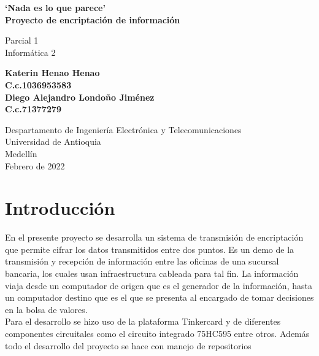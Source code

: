 \documentclass{article}
\begin{document}
\begin{titlepage}
    \begin{center}
        \vspace*{2cm}
            
        \Huge
        \textbf{`Nada es lo que parece' \\
        Proyecto de encriptación de información}
            
        \vspace{0.5cm}
        \LARGE
        Parcial 1\\
        Informática 2

        
            
        \vspace{2,5cm}
            
        \textbf{
        Katerin Henao Henao\\
        C.c.1036953583\\
        Diego Alejandro Londoño Jiménez\\
        C.c.71377279\\
        }
            
        \vfill
            
        \vspace{2,5cm}
            
        \Large
        Despartamento de Ingeniería Electrónica y Telecomunicaciones\\
        Universidad de Antioquia\\
        Medellín\\
        Febrero de 2022
            
    \end{center}
\end{titlepage}

\tableofcontents
\newpage


\section{Introducción}
\label{intro}
En el presente proyecto se desarrolla un sistema de transmisión de encriptación que permite cifrar los datos transmitidos entre dos puntos. Es un demo de la transmisión y recepción de información entre las oficinas de una sucursal bancaria, los cuales usan infraestructura cableada para tal fin. La información viaja desde un computador de origen que es el generador de la información, hasta un computador destino que es el que se presenta al encargado de tomar decisiones en la bolsa de valores. \\
Para el desarrollo se hizo uso de la plataforma Tinkercard y de diferentes componentes circuitales como el circuito integrado 75HC595 entre otros. Además todo el desarrollo del proyecto se hace con manejo de repositorios
\end{document}
